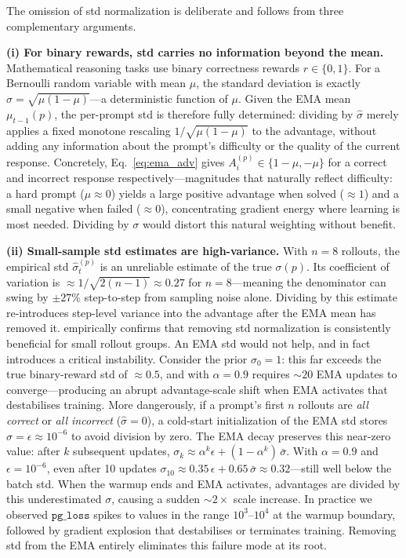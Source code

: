 \documentclass[11pt]{article}
\theoremstyle{definition}
\begin{document}
The omission of std normalization is deliberate and follows from three
complementary arguments.

\textbf{(i) For binary rewards, std carries no information beyond the mean.}
Mathematical reasoning tasks use binary correctness rewards $r \in \{0,1\}$.
For a Bernoulli random variable with mean $\mu$, the standard deviation is
exactly $\sigma = \sqrt{\mu(1-\mu)}$---a deterministic function of $\mu$.
Given the EMA mean $\mu_{t-1}(p)$, the per-prompt std is therefore fully
determined: dividing by $\hat{\sigma}$ merely applies a fixed monotone
rescaling $1/\sqrt{\mu(1-\mu)}$ to the advantage, without adding any
information about the prompt's difficulty or the quality of the current
response.
Concretely, Eq.~\eqref{eq:ema_adv} gives $A_i^{(p)} \in \{1-\mu, -\mu\}$
for a correct and incorrect response respectively---magnitudes that naturally
reflect difficulty: a hard prompt ($\mu \approx 0$) yields a large positive
advantage when solved ($\approx 1$) and a small negative when failed
($\approx 0$), concentrating gradient energy where learning is most needed.
Dividing by $\sigma$ would distort this natural weighting without benefit.

\textbf{(ii) Small-sample std estimates are high-variance.}
With $n=8$ rollouts, the empirical std $\hat{\sigma}_t^{(p)}$ is an
unreliable estimate of the true $\sigma(p)$.
Its coefficient of variation is $\approx 1/\!\sqrt{2(n-1)} \approx 0.27$
for $n=8$---meaning the denominator can swing by $\pm 27\%$ step-to-step
from sampling noise alone.
Dividing by this estimate re-introduces step-level variance into the
advantage after the EMA mean has removed it.
\citet{liu2025drgrpo} empirically confirms that removing std normalization
is consistently beneficial for small rollout groups.
An EMA std would not help, and in fact introduces a critical instability.
Consider the prior $\sigma_0 = 1$: this far exceeds the true binary-reward
std of $\approx 0.5$, and with $\alpha=0.9$ requires $\sim\!20$ EMA
updates to converge---producing an abrupt advantage-scale shift when EMA
activates that destabilises training.
More dangerously, if a prompt's first $n$ rollouts are \emph{all correct}
or \emph{all incorrect} ($\hat{\sigma}=0$), a cold-start initialization
of the EMA std stores $\hat{\sigma}=\epsilon \approx 10^{-6}$ to avoid
division by zero.
The EMA decay preserves this near-zero value: after $k$ subsequent updates,
$\sigma_k \approx \alpha^k \epsilon + (1-\alpha^k)\,\bar{\sigma}$.
With $\alpha=0.9$ and $\epsilon=10^{-6}$, even after 10 updates
$\sigma_{10} \approx 0.35\,\epsilon + 0.65\,\bar{\sigma} \approx 0.32$---still
well below the batch std.
When the warmup ends and EMA activates, advantages are divided by this
underestimated $\sigma$, causing a sudden $\sim\!2\times$ scale increase.
In practice we observed $\mathtt{pg\_loss}$ spikes to values in the
range $10^3$--$10^4$ at the warmup boundary, followed by gradient explosion
that destabilises or terminates training.
Removing std from the EMA entirely eliminates this failure mode at its root.
\end{document}
